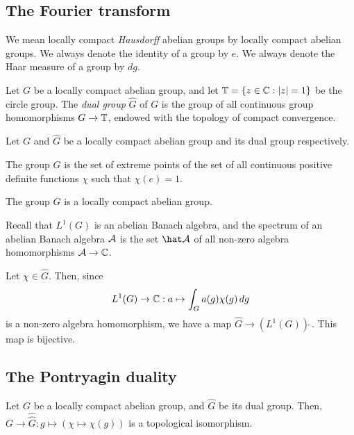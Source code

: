 \documentclass[12pt]{article}
\begin{document}
\subsection{The Fourier transform}

We mean locally compact \emph{Hausdorff} abelian groups by locally compact abelian groups.
We always denote the identity of a group by $e$.
We always denote the Haar measure of a group by $dg$.


\begin{defn}
Let $G$ be a locally compact abelian group, and let $\mathbb{T}=\{z\in\mathbb{C}:|z|=1\}$ be the circle group.
The \emph{dual group} $\hat G$ of $G$ is the group of all continuous group homomorphisms $G\to\mathbb{T}$, endowed with the topology of compact convergence.
\end{defn}

\begin{prop}
Let $G$ and $\hat G$ be a locally compact abelian group and its dual group respectively.
\begin{parts}
\item The group $\hat G$ is the set of extreme points of the set of all continuous positive definite functions $\chi$ such that $\chi(e)=1$.
\item The group $\hat G$ is a locally compact abelian group.
\end{parts}
\end{prop}
\begin{pf}

\end{pf}



Recall that $L^1(G)$ is an abelian Banach algebra, and the spectrum of an abelian Banach algebra $\mathcal{A}$ is the set $\hat\cA$ of all non-zero algebra homomorphisms $\mathcal{A}\to\mathbb{C}$.

Let $\chi\in\hat G$.
Then, since
\[L^1(G)\to\mathbb{C}:a\mapsto\int_Ga(g)\chi(g)\,dg\]
is a non-zero algebra homomorphism, we have a map $\hat G\to(L^1(G))\hat\ $.
This map is bijective.


\begin{thm}
\end{thm}




\subsection{The Pontryagin duality}
\begin{thm}
Let $G$ be a locally compact abelian group, and $\hat G$ be its dual group.
Then, $G\to\hat{\hat G}:g\mapsto(\chi\mapsto\chi(g))$ is a topological isomorphism.
\end{thm}
\begin{pf}
\end{pf}
\begin{ex}

\end{ex}
\end{document}
